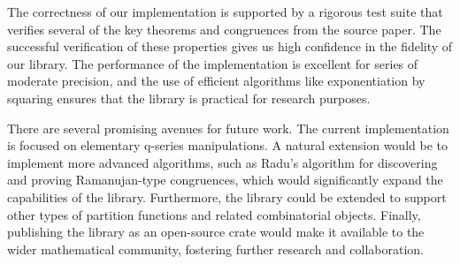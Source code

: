 \documentclass{article}
\begin{document}
The correctness of our implementation is supported by a rigorous test suite that verifies several of the key theorems and congruences from the source paper. The successful verification of these properties gives us high confidence in the fidelity of our library. The performance of the implementation is excellent for series of moderate precision, and the use of efficient algorithms like exponentiation by squaring ensures that the library is practical for research purposes.

There are several promising avenues for future work. The current implementation is focused on elementary q-series manipulations. A natural extension would be to implement more advanced algorithms, such as Radu's algorithm for discovering and proving Ramanujan-type congruences, which would significantly expand the capabilities of the library. Furthermore, the library could be extended to support other types of partition functions and related combinatorial objects. Finally, publishing the library as an open-source crate would make it available to the wider mathematical community, fostering further research and collaboration.



\end{document}
